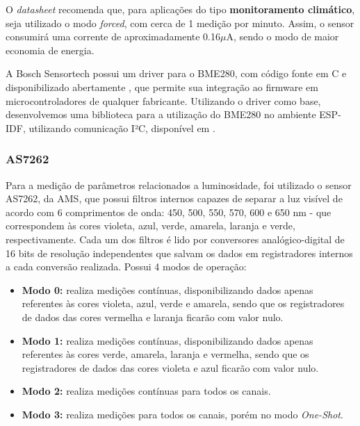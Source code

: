\documentclass[../monografia.tex]{subfiles}
\begin{document}
O \textit{datasheet} recomenda que, para aplicações do tipo \textbf{monitoramento climático}, seja utilizado o modo \textit{forced}, com cerca de 1 medição por minuto. Assim, o sensor consumirá uma corrente de aproximadamente 0.16$\mu$A, sendo o modo de maior economia de energia. 

A Bosch Sensortech possui um driver para o BME280, com código fonte em C e disponibilizado abertamente \cite{bme280-driver}, que permite sua integração ao firmware em microcontroladores de qualquer fabricante. 
Utilizando o driver como base, desenvolvemos uma biblioteca para a utilização do BME280 no ambiente ESP-IDF, utilizando comunicação I²C, disponível em \cite{bme280-lib}.



\subsubsection{AS7262} \label{as7262}

Para a medição de parâmetros relacionados a luminosidade, foi utilizado o sensor AS7262, da AMS, que possui filtros internos capazes de separar a luz visível de acordo com 6 comprimentos de onda: 450, 500, 550, 570, 600 e 650 nm - que correspondem às cores violeta, azul, verde, amarela, laranja e verde, respectivamente. Cada um dos filtros é lido por conversores analógico-digital de 16 bits de resolução independentes que salvam os dados em registradores internos a cada conversão realizada. Possui 4 modos de operação:

\begin{itemize}
	\item \textbf{Modo 0:} realiza medições contínuas, disponibilizando dados apenas referentes às cores violeta, azul, verde e amarela, sendo que os registradores de dados das cores vermelha e laranja ficarão com valor nulo.
	\item \textbf{Modo 1:} realiza medições contínuas, disponibilizando dados apenas referentes às cores verde, amarela, laranja e vermelha, sendo que os registradores de dados das cores violeta e azul ficarão com valor nulo.
	\item \textbf{Modo 2:} realiza medições contínuas para todos os canais.
	\item \textbf{Modo 3:} realiza medições para todos os canais, porém no modo \textit{One-Shot}.
\end{itemize}
\end{document}

